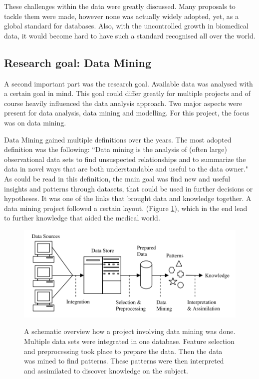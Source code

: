 \documentclass[10pt,a4paper]{article}
\begin{document}
	These challenges within the data were greatly discussed.\cite{bellazzi2011data} Many proposals to tackle them were made, however none was actually widely adopted, yet, as a global standard for databases. Also, with the uncontrolled growth in biomedical data, it would become hard to have such a standard recognised all over the world.\cite{Otasek2014, marenco2004qis, bichutskiy2006heterogeneous, sperzel1991biomedical, aubry1988design, Windridge2014}  
	
	\subsection{Research goal: Data Mining}
	\label{subsec:ResearchTarget}
	
	A second important part was the research goal. Available data was analysed with a certain goal in mind. This goal could differ greatly for multiple projects and of course heavily influenced the data analysis approach. Two major aspects were present for data analysis, data mining and modelling. For this project, the focus was on data mining.
	
	Data Mining gained multiple definitions over the years. The most adopted definition was the following: “Data mining is the analysis of (often large) observational data sets to find unsuspected relationships and to summarize the data in novel ways that are both understandable and useful to the data owner."\cite{hand2001principles} As could be read in this definition, the main goal was find new and useful insights and patterns through datasets, that could be used in further decisions or hypotheses.\cite{chen2006medical, 7024124} It was one of the links that brought data and knowledge together.\cite{Yoo2012} A data mining project followed a certain layout. (Figure \ref{fig:ResearchSteps}), which in the end lead to further knowledge that aided the medical world.\cite{bramer2007principles} 
	
	\begin{figure}
		\includegraphics[scale=1.0]{ResearchSteps.png}
		\label{fig:ResearchSteps}
		\caption{A schematic overview how a project involving data mining was done. Multiple data sets were integrated in one database. Feature selection and preprocessing took place to prepare the data. Then the data was mined to find patterns. These patterns were then interpreted and assimilated to discover knowledge on the subject.\cite{bramer2007principles}}
	\end{figure}
	
\end{document}
